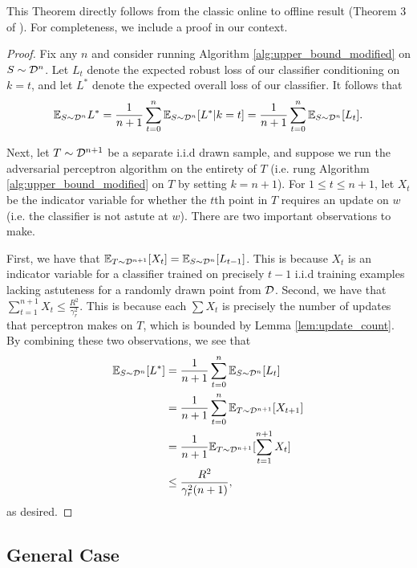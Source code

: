This Theorem directly follows from the classic online to offline result (Theorem 3 of \cite{Freund99}). For completeness, we include a proof in our context.

\begin{proof}
Fix any $n$ and consider running Algorithm \ref{alg:upper_bound_modified} on $S \sim {\mathcal D}^n$. Let $L_t$ denote the expected robust loss of our classifier conditioning on $k = t$, and let $L^*$ denote the expected overall loss of our classifier. It follows that $$\mathbb{E}_{S \sim {\mathcal D}^n} L^* = \frac{1}{n+1}\sum_{t=0}^n \mathbb{E}_{S \sim {\mathcal D}^n}[L^*|k = t] = \frac{1}{n+1}\sum_{t=0}^n \mathbb{E}_{S \sim {\mathcal D}^n}[L_t].$$

Next, let $T \sim {\mathcal D}^{n+1}$ be a separate i.i.d drawn sample, and suppose we run the adversarial perceptron algorithm on the entirety of $T$ (i.e. rung Algorithm \ref{alg:upper_bound_modified} on $T$ by setting $k = n+1$). For $1 \leq t \leq n + 1$, let $X_t$ be the indicator variable for whether the $t$th point in $T$ requires an update on $w$ (i.e. the classifier is not astute at $w$). There are two important observations to make.

First, we have that $\mathbb{E}_{T \sim {\mathcal D}^{n+1}}[X_t] = \mathbb{E}_{S \sim {\mathcal D}^n}[L_{t-1}]$. This is because $X_t$ is an indicator variable for a classifier trained on precisely $t-1$ i.i.d training examples lacking astuteness for a randomly drawn point from ${\mathcal D}$. Second, we have that $\sum_{t = 1}^{n+1} X_t \leq \frac{R^2}{\gamma_r^2}$. This is because each $\sum X_t$ is precisely the number of updates that perceptron makes on $T$, which is bounded by Lemma \ref{lem:update_count}. By combining these two observations, we see that 
\begin{equation*}
\begin{split}
\mathbb{E}_{S \sim {\mathcal D}^n}[L^*] &= \frac{1}{n+1}\sum_{t=0}^n \mathbb{E}_{S \sim {\mathcal D}^n}[L_t] \\
&= \frac{1}{n+1}\sum_{t=0}^n \mathbb{E}_{T \sim {\mathcal D}^{n+1}}[X_{t+1}] \\
&= \frac{1}{n+1}\mathbb{E}_{T \sim {\mathcal D}^{n+1}}[\sum_{t = 1}^{n+1} X_{t}] \\
&\leq \frac{R^2}{\gamma_r^2(n+1)},
\end{split}
\end{equation*}
as desired. 
\end{proof}

\subsection{General Case}\label{sec:upper_bound_general}

